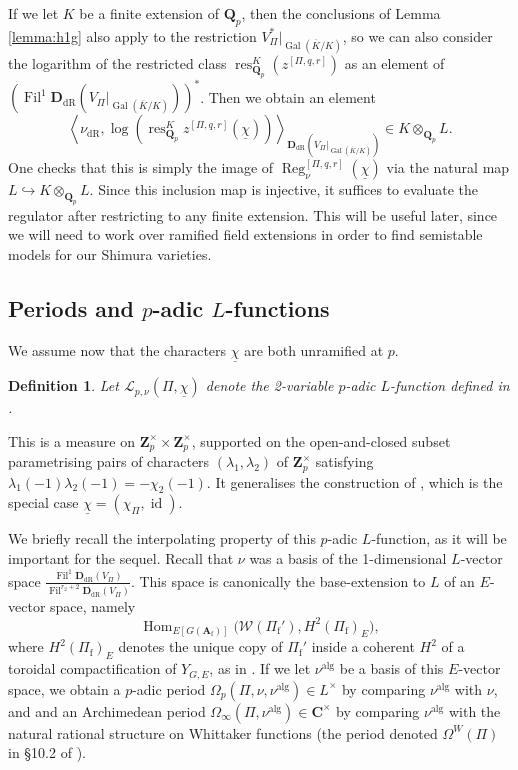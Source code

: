\documentclass[cjm]{ipart}
\theoremstyle{plain}
\newtheorem{definition}[theorem]{Definition}
\theoremstyle{remark}
\DeclareMathOperator{\alg}{alg}
\DeclareMathOperator{\Fil}{Fil}
\DeclareMathOperator{\Gal}{Gal}
\DeclareMathOperator{\Hom}{Hom}
\DeclareMathOperator{\id}{id}
\newcommand{\Af}{\AA_{\mathrm{f}}}
\newcommand{\CC}{\mathbf{C}}
\newcommand{\DdR}{\mathbf{D}_{\mathrm{dR}}}
\newcommand{\Pif}{\Pi_{\mathrm{f}}}
\newcommand{\QQ}{\mathbf{Q}}
\newcommand{\Qp}{\QQ_p}
\newcommand{\Zp}{\mathbf{Z}_p}
\newcommand{\cL}{\mathcal{L}}
\newcommand{\cW}{\mathcal{W}}
\newcommand{\dR}{\mathrm{dR}}
\newcommand{\into}{\hookrightarrow}
\newcommand{\uchi}{\underline{\chi}}
\renewcommand{\AA}{\mathbf{A}}
\numberwithin{equation}{subsection}
\begin{document}
  \begin{note}
   \label{note:baseext}
   If we let $K$ be a finite extension of $\Qp$, then the conclusions of Lemma \ref{lemma:h1g} also apply to the restriction $V_\Pi^* |_{\Gal(\overline{K} / K)}$, so we can also consider the logarithm of the restricted class $\operatorname{res}_{\Qp}^K\left(z^{[\Pi, q, r]}\right)$ as an element of $\left(\Fil^1 \DdR(V_\Pi |_{\Gal(\overline{K} / K)}) \right)^*$. Then we obtain an element
   \[
    \left\langle \nu_{\dR}, \log\left(\operatorname{res}_{\Qp}^K z^{[\Pi, q, r]}(\uchi) \right)\right\rangle_{\DdR(V_\Pi |_{\Gal(\overline{K} / K)})} \in K \otimes_{\Qp} L.
   \]
   One checks that this is simply the image of $\operatorname{Reg}_{\nu}^{[\Pi, q, r]}(\uchi)$ via the natural map $L \into K \otimes_{\Qp} L$. Since this inclusion map is injective, it suffices to evaluate the regulator after restricting to any finite extension. This will be useful later, since we will need to work over ramified field extensions in order to find semistable models for our Shimura varieties.
  \end{note}


 \subsection{Periods and $p$-adic $L$-functions}
 \label{sect:periods}

  We assume now that the characters $\uchi$ are both unramified at $p$.

  \begin{definition}
   Let $\cL_{p, \nu}(\Pi, \uchi)$ denote the 2-variable $p$-adic $L$-function defined in \cite[Theorem 6.2.5]{LZ-equivar}.
  \end{definition}

  This is a measure on $\Zp^\times \times \Zp^\times$, supported on the open-and-closed subset parametrising pairs of characters $(\lambda_1, \lambda_2)$ of $\Zp^\times$ satisfying $\lambda_1(-1) \lambda_2(-1) = -\chi_2(-1)$. It generalises the construction of \cite[Proposition 10.4]{LPSZ1}, which is the special case $\uchi = (\chi_{\Pi}, \id)$.

  We briefly recall the interpolating property of this $p$-adic $L$-function, as it will be important for the sequel. Recall that $\nu$ was a basis of the 1-dimensional $L$-vector space $\frac{\Fil^1 \DdR(V_\Pi)}{\Fil^{r_2 + 2} \DdR(V_\Pi)}$. This space is canonically the base-extension to $L$ of an $E$-vector space, namely
  \[ \Hom_{E[G(\Af)]}\Big( \cW(\Pif'), H^2(\Pif)_E\Big),\]
  where $H^2(\Pif)_E$ denotes the unique copy of $\Pif'$ inside a coherent $H^2$ of a toroidal compactification of $Y_{G, E}$, as in \cite[\S 5.2]{LPSZ1}. If we let $\nu^{\alg}$ be a basis of this $E$-vector space, we obtain a $p$-adic period $\Omega_p(\Pi, \nu, \nu^{\alg}) \in L^\times$ by comparing $\nu^{\alg}$ with $\nu$, and and an Archimedean period $\Omega_\infty(\Pi, \nu^{\alg}) \in \CC^\times$ by comparing $\nu^{\alg}$ with the natural rational structure on Whittaker functions (the period denoted $\Omega^W(\Pi)$ in \S 10.2 of \cite{LPSZ1}).
\end{document}
